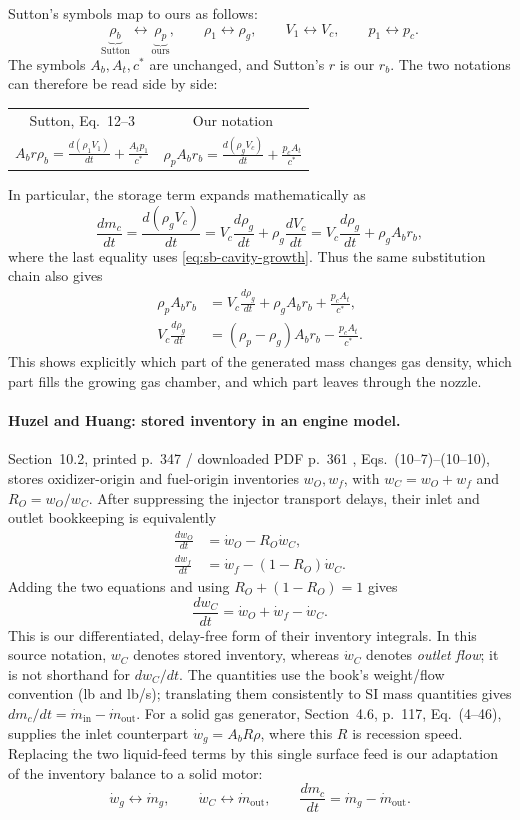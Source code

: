 Sutton's symbols map to ours as follows:
\[
 \underbrace{\rho_b}_{\text{Sutton}}\longleftrightarrow
 \underbrace{\rho_p}_{\text{ours}},\qquad
 \rho_1\longleftrightarrow\rho_g,\qquad
 V_1\longleftrightarrow V_c,\qquad
 p_1\longleftrightarrow p_c.
\]
The symbols $A_b,A_t,c^*$ are unchanged, and Sutton's $r$ is our
$r_b$. The two notations can
therefore be read side by side:
\begin{center}
\begin{tabular}{c@{\qquad}c}
Sutton, Eq.~12--3 & Our notation\\[6pt]
$\displaystyle A_b r\rho_b
 =\frac{d(\rho_1V_1)}{dt}+\frac{A_t p_1}{c^*}$
&
$\displaystyle \rho_p A_b r_b
 =\frac{d(\rho_gV_c)}{dt}+\frac{p_c A_t}{c^*}$
\end{tabular}
\end{center}
In particular, the storage term expands mathematically as
\[
 \frac{dm_c}{dt}
 =\frac{d(\rho_gV_c)}{dt}
 =V_c\frac{d\rho_g}{dt}+\rho_g\frac{dV_c}{dt}
 =V_c\frac{d\rho_g}{dt}+\rho_g A_b r_b,
\]
where the last equality uses \eqref{eq:sb-cavity-growth}. Thus the
same substitution chain also gives
\[
\begin{aligned}
 \rho_p A_b r_b
 &=V_c\frac{d\rho_g}{dt}+\rho_g A_b r_b+\frac{p_c A_t}{c^*},\\
 V_c\frac{d\rho_g}{dt}
 &=(\rho_p-\rho_g)A_b r_b-\frac{p_c A_t}{c^*}.
\end{aligned}
\]
This shows explicitly which part of the generated mass changes gas
density, which part fills the growing gas chamber, and which part
leaves through the nozzle.


\paragraph{Huzel and Huang: stored inventory in an engine model.}
Section~10.2, printed p.~347 / downloaded PDF p.~361
\cite{huzelhuang}, Eqs.~(10--7)--(10--10), stores oxidizer-origin and
fuel-origin inventories $w_O,w_f$, with $w_C=w_O+w_f$ and
$R_O=w_O/w_C$. After suppressing the injector transport delays, their
inlet and outlet bookkeeping is equivalently
\begin{align*}
 \frac{dw_O}{dt}&=\dot w_O-R_O\dot w_C,\\
 \frac{dw_f}{dt}&=\dot w_f-(1-R_O)\dot w_C.
\end{align*}
Adding the two equations and using $R_O+(1-R_O)=1$ gives
\[
 \frac{dw_C}{dt}=\dot w_O+\dot w_f-\dot w_C.
\]
This is our differentiated, delay-free form of their inventory
integrals. In this source notation, $w_C$ denotes stored inventory,
whereas $\dot w_C$ denotes \emph{outlet flow}; it is not shorthand for
$dw_C/dt$. The quantities use the book's weight/flow convention
(lb and lb/s); translating them consistently to SI mass quantities gives
$dm_c/dt=\dot m_{\mathrm{in}}-\dot m_{\mathrm{out}}$.
For a solid gas generator, Section~4.6, p.~117, Eq.~(4--46), supplies
the inlet counterpart $\dot w_g=A_bR\rho$, where this $R$ is recession
speed. Replacing the two liquid-feed terms by this single surface feed
is our adaptation of the inventory balance to a solid motor:
\[
 \dot w_g\longleftrightarrow\dot m_g,\qquad
 \dot w_C\longleftrightarrow\dot m_{\mathrm{out}},\qquad
 \frac{dm_c}{dt}=\dot m_g-\dot m_{\mathrm{out}}.
\]

